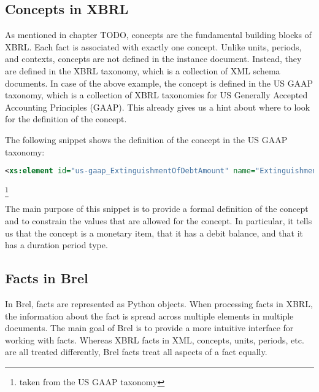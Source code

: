 \subsection{Concepts in XBRL}

As mentioned in chapter TODO, concepts are the fundamental building blocks of XBRL.
Each fact is associated with exactly one concept.
Unlike units, periods, and contexts, concepts are not defined in the instance document.
Instead, they are defined in the XBRL taxonomy, which is a collection of XML schema documents.
In case of the above example, the concept is defined in the US GAAP taxonomy, which is a collection of XBRL taxonomies for US Generally Accepted Accounting Principles (GAAP).
This already gives us a hint about where to look for the definition of the concept.

The following snippet shows the definition of the concept in the US GAAP taxonomy:

\begin{lstlisting}[language=XML]
    <xs:element id="us-gaap_ExtinguishmentOfDebtAmount" name="ExtinguishmentOfDebtAmount" nillable="true" substitutionGroup="xbrli:item" type="xbrli:monetaryItemType" xbrli:balance="debit" xbrli:periodType="duration"/>
\end{lstlisting}\footnote[4]{taken from the US GAAP taxonomy}

The main purpose of this snippet is to provide a formal definition of the concept and to constrain the values that are allowed for the concept.
In particular, it tells us that the concept is a monetary item, that it has a debit balance, and that it has a duration period type.

\subsection{Facts in Brel}

In Brel, facts are represented as Python objects. 
When processing facts in XBRL, the information about the fact is spread across multiple elements in multiple documents.
The main goal of Brel is to provide a more intuitive interface for working with facts.
Whereas XBRL facts in XML, concepts, units, periods, etc. are all treated differently, Brel facts treat all aspects of a fact equally.